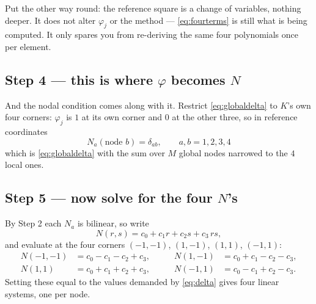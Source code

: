 \documentclass[11pt]{article}
\begin{document}
\medskip
{\small\color{black!60}Put the other way round: the reference square is a change
of variables, nothing deeper. It does not alter $\varphi_{j}$ or the method ---
\eqref{eq:fourterms} is still what is being computed. It only spares you from
re-deriving the same four polynomials once per element.}

\subsection*{Step 4 --- this is where $\varphi$ becomes $N$}

\medskip\noindent{}

\medskip
And the nodal condition comes along with it. Restrict \eqref{eq:globaldelta} to
$K$'s own four corners: $\varphi_{j}$ is $1$ at its own corner and $0$ at the
other three, so in reference coordinates
\begin{equation}\label{eq:delta}
  \boxed{\;N_{a}(\text{node } b)=\delta_{ab},\qquad a,b=1,2,3,4\;}
\end{equation}
which is \eqref{eq:globaldelta} with the sum over $M$ global nodes narrowed to
the $4$ local ones.

\subsection*{Step 5 --- now solve for the four $N$'s}

By Step 2 each $N_{a}$ is bilinear, so write
\begin{equation}\label{eq:Ngen}
  N(r,s)=c_{0}+c_{1}r+c_{2}s+c_{3}\,rs ,
\end{equation}
and evaluate at the four corners $(-1,-1)$, $(1,-1)$, $(1,1)$, $(-1,1)$:
\begin{equation}\label{eq:4eqs}
\begin{aligned}
  N(-1,-1)&=c_{0}-c_{1}-c_{2}+c_{3},&\qquad
  N(1,-1)&=c_{0}+c_{1}-c_{2}-c_{3},\\
  N(1,1)&=c_{0}+c_{1}+c_{2}+c_{3},&\qquad
  N(-1,1)&=c_{0}-c_{1}+c_{2}-c_{3}.
\end{aligned}
\end{equation}
Setting these equal to the values demanded by \eqref{eq:delta} gives four
linear systems, one per node.
\end{document}
